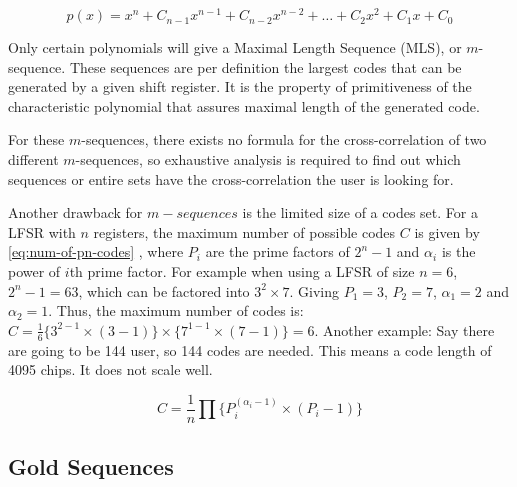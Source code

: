 		\begin{equation}
			\label{eq:lfsr-polynomial}
			p(x) = x^n + C_{n-1} x^{n-1}  + C_{n-2} x^{n-2} + \dotsc + C_{2} x^{2}  + C_{1} x  + C_{0}
		\end{equation}


		Only certain polynomials will give a Maximal Length Sequence (MLS), or $m$-sequence.
		These sequences are per definition the largest codes that can be generated by a given shift register.
		It is the property of primitiveness of the characteristic polynomial that assures maximal length of the generated code. 


		For these $m$-sequences, there exists no formula for the cross-correlation of two different $m$-sequences, so exhaustive analysis is required to find out which sequences or entire sets have the cross-correlation the user is looking for.

		Another drawback for $m-sequences$ is the limited size of a codes set.
		For a LFSR with $n$ registers, the maximum number of possible codes $C$ is given by \autoref{eq:num-of-pn-codes} \cite{mutagi1996pseudo}, where $P_i$ are the prime factors of $2^n - 1$ and $\alpha_i$ is the power of $i$th prime factor.
		For example when using a LFSR of size $n = 6$, $2^n - 1 = 63$, which can be factored into $3^2 \times 7$.
		Giving $P_1 = 3$, $P_2 = 7$, $\alpha_1 = 2$ and $\alpha_2 = 1$.
		Thus, the maximum number of codes is: $C = \frac{1}{6} \{ 3^{2 - 1} \times (3 - 1) \} \times \{ 7^{1 - 1} \times (7 - 1) \} = 6$.
		Another example: Say there are going to be 144 user, so 144 codes are needed. 
		This means a code length of 4095 chips.
		It does not scale well.

		\begin{equation}
			\label{eq:num-of-pn-codes}
			C = \frac{1}{n} \prod \{ P_{i} ^ {(\alpha_i - 1)} \times (P_i - 1) \}
		\end{equation}

	\subsection{Gold Sequences}

